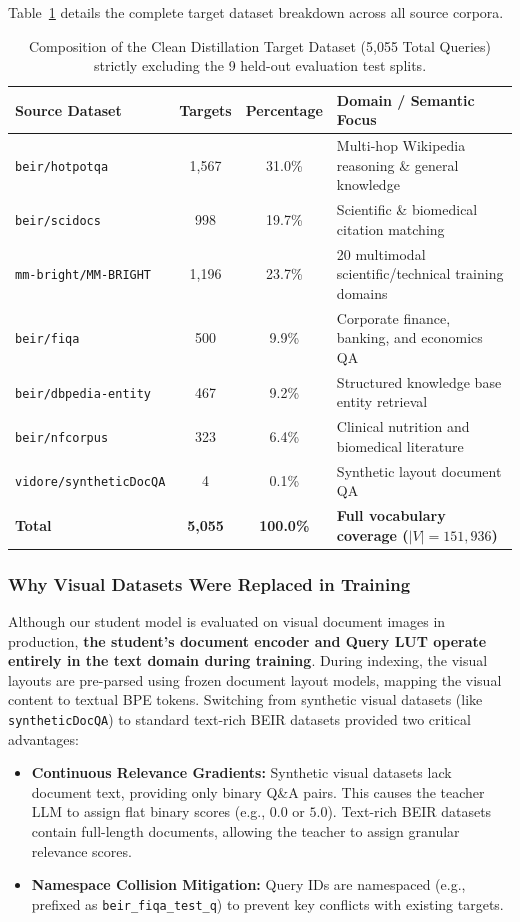 \documentclass[11pt,a4paper]{article}
\begin{document}
Table~\ref{tab:target_dataset_breakdown} details the complete target dataset breakdown across all source corpora.

\begin{table}[htbp]
\centering
\scriptsize
\caption{Composition of the Clean Distillation Target Dataset (5,055 Total Queries) strictly excluding the 9 held-out evaluation test splits.}
\label{tab:target_dataset_breakdown}
\begin{tabular}{lccl}
\toprule
\textbf{Source Dataset} & \textbf{Targets} & \textbf{Percentage} & \textbf{Domain / Semantic Focus} \\
\midrule
\texttt{beir/hotpotqa} & 1,567 & 31.0\% & Multi-hop Wikipedia reasoning \& general knowledge \\
\texttt{beir/scidocs} & 998 & 19.7\% & Scientific \& biomedical citation matching \\
\texttt{mm-bright/MM-BRIGHT} & 1,196 & 23.7\% & 20 multimodal scientific/technical training domains \\
\texttt{beir/fiqa} & 500 & 9.9\% & Corporate finance, banking, and economics QA \\
\texttt{beir/dbpedia-entity} & 467 & 9.2\% & Structured knowledge base entity retrieval \\
\texttt{beir/nfcorpus} & 323 & 6.4\% & Clinical nutrition and biomedical literature \\
\texttt{vidore/syntheticDocQA} & 4 & 0.1\% & Synthetic layout document QA \\
\midrule
\textbf{Total} & \textbf{5,055} & \textbf{100.0\%} & \textbf{Full vocabulary coverage ($|V|=151,936$)} \\
\bottomrule
\end{tabular}
\end{table}

\subsubsection{Why Visual Datasets Were Replaced in Training}
Although our student model is evaluated on visual document images in production, \textbf{the student's document encoder and Query LUT operate entirely in the text domain during training}. During indexing, the visual layouts are pre-parsed using frozen document layout models, mapping the visual content to textual BPE tokens.
Switching from synthetic visual datasets (like \texttt{syntheticDocQA}) to standard text-rich BEIR datasets provided two critical advantages:
\begin{itemize}
    \item \textbf{Continuous Relevance Gradients:} Synthetic visual datasets lack document text, providing only binary Q\&A pairs. This causes the teacher LLM to assign flat binary scores (e.g., $0.0$ or $5.0$). Text-rich BEIR datasets contain full-length documents, allowing the teacher to assign granular relevance scores.
    \item \textbf{Namespace Collision Mitigation:} Query IDs are namespaced (e.g., prefixed as \texttt{beir\_fiqa\_test\_q}) to prevent key conflicts with existing targets.
\end{itemize}
\end{document}
